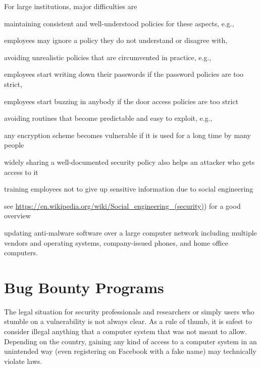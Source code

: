 For large institutions, major difficulties are
\begin{compactitem}
 \item maintaining consistent and well-understood policies for these aspects, e.g.,
  \begin{compactitem}
   \item employees may ignore a policy they do not understand or disagree with,
  \end{compactitem} 
 \item avoiding unrealistic policies that are circumvented in practice, e.g.,
  \begin{compactitem}
   \item employees start writing down their passwords if the password policies are too strict,
   \item employees start buzzing in anybody if the door access policies are too strict
  \end{compactitem}
 \item avoiding routines that become predictable and easy to exploit, e.g.,
  \begin{compactitem}
   \item any encryption scheme becomes vulnerable if it is used for a long time by many people
   \item widely sharing a well-documented security policy also helps an attacker who gets access to it
  \end{compactitem}
 \item training employees not to give up sensitive information due to social engineering
  \begin{compactitem}
   \item see \url{https://en.wikipedia.org/wiki/Social_engineering_(security)}) for a good overview
  \end{compactitem} 
 \item updating anti-malware software over a large computer network including multiple vendors and operating systems, company-issued phones, and home office computers.
\end{compactitem}

\section{Bug Bounty Programs}

The legal situation for security professionals and researchers or simply users who stumble on a vulnerability is not always clear.
As a rule of thumb, it is safest to consider illegal anything that a computer system that was not meant to allow.
Depending on the country, gaining any kind of access to a computer system in an unintended way (even registering on Facebook with a fake name) may technically violate laws.

